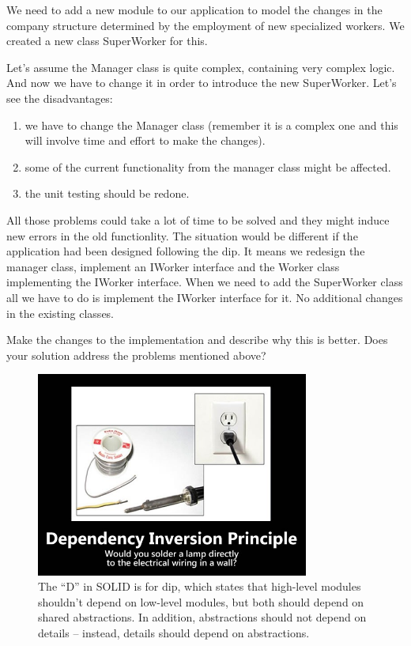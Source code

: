 We need to add a new module to our application to model the changes in the company structure determined by the employment of new specialized workers. We created a new class SuperWorker for this.

Let's assume the Manager class is quite complex, containing very complex logic. And now we have to change it in order to introduce the new SuperWorker. Let's see the disadvantages:

\begin{enumerate}
	\item we have to change the Manager class (remember it is a complex one and this will involve time and effort to make the changes).
	\item some of the current functionality from the manager class might be affected.
	\item the unit testing should be redone.
\end{enumerate}

All those problems could take a lot of time to be solved and they might induce new errors in the old functionlity. The situation would be different if the application had been designed following the \gls{dip}. It means we redesign the manager class, implement an IWorker interface and the Worker class implementing the IWorker interface. When we need to add the SuperWorker class all we have to do is implement the IWorker interface for it. No additional changes in the existing classes.

\begin{exercise}
	Make the changes to the implementation and describe why this is better. Does your solution address the problems mentioned above? 
\end{exercise}

\begin{figure}
	\centering
	\includegraphics[width=0.8\textwidth]{images/kotlin/DIP.jpg}
	\caption{The “D” in SOLID is for \gls{dip}, which states that high-level modules shouldn’t depend on low-level modules, but both should depend on shared abstractions. In addition, abstractions should not depend on details – instead, details should depend on abstractions.}
	\label{fir:dsp}
\end{figure}


